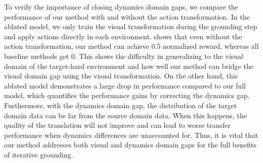 To verify the importance of closing dynamics domain gaps, we compare the performance of our method with and without the action transformation.  In the ablated model, we only train the visual transformation during the grounding step and apply actions directly in each environment.   shows that even without the action transformation, our method can achieve 0.5 normalized reward, whereas all baseline methods get 0. This shows the difficulty in generalizing to the visual domain of the target-hard environment and how well our method can bridge the visual domain gap using the visual transformation.
On the other hand, this ablated model demonstrates a large drop in performance compared to our full model, which quantifies the performance gains by correcting the dynamics gap. Furthermore, with the dynamics domain gap, the distribution of the target domain data can be far from the source domain data.  When this happens, the quality of the translation will not improve and can lead to worse transfer performance when dynamics differences are unaccounted for.  Thus, it is vital that our method addresses both visual and dynamics domain gaps for the full benefits of iterative grounding.
